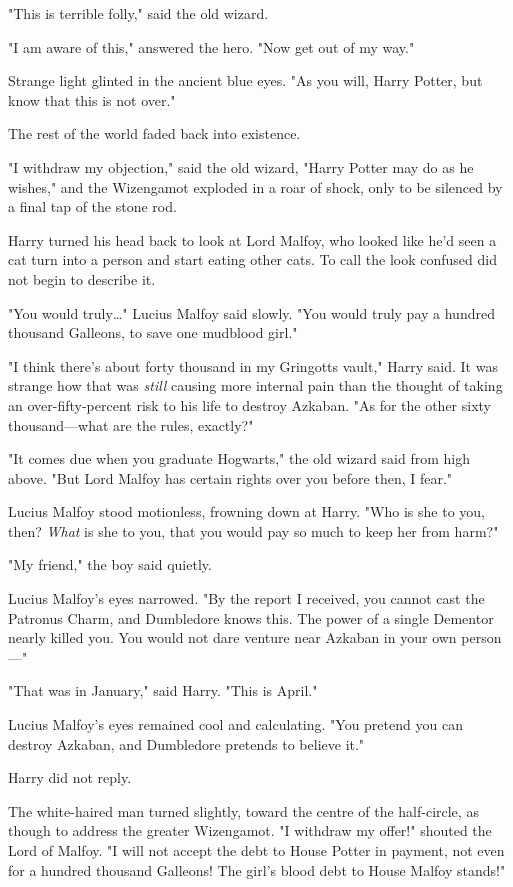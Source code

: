 "This is terrible folly," said the old wizard.

"I am aware of this," answered the hero. "Now get out of my way."

Strange light glinted in the ancient blue eyes. "As you will, Harry Potter, but
know that this is not over."

The rest of the world faded back into existence.

"I withdraw my objection," said the old wizard, "Harry Potter may do as he
wishes," and the Wizengamot exploded in a roar of shock, only to be silenced by
a final tap of the stone rod.

Harry turned his head back to look at Lord Malfoy, who looked like he'd seen a
cat turn into a person and start eating other cats. To call the look confused
did not begin to describe it.

"You would truly{\ldots}" Lucius Malfoy said slowly. "You would truly pay a
hundred thousand Galleons, to save one mudblood girl."

"I think there's about forty thousand in my Gringotts vault," Harry said. It
was strange how that was \emph{still} causing more internal pain than the
thought of taking an over-fifty-percent risk to his life to destroy Azkaban.
"As for the other sixty thousand---what are the rules, exactly?"

"It comes due when you graduate Hogwarts," the old wizard said from high above.
"But Lord Malfoy has certain rights over you before then, I fear."

Lucius Malfoy stood motionless, frowning down at Harry. "Who is she to you,
then? \emph{What} is she to you, that you would pay so much to keep her from
harm?"

"My friend," the boy said quietly.

Lucius Malfoy's eyes narrowed. "By the report I received, you cannot cast the
Patronus Charm, and Dumbledore knows this. The power of a single Dementor
nearly killed you. You would not dare venture near Azkaban in your own
person---"

"That was in January," said Harry. "This is April."

Lucius Malfoy's eyes remained cool and calculating. "You pretend you can
destroy Azkaban, and Dumbledore pretends to believe it."

Harry did not reply.

The white-haired man turned slightly, toward the centre of the half-circle, as
though to address the greater Wizengamot. "I withdraw my offer!" shouted the
Lord of Malfoy. "I will not accept the debt to House Potter in payment, not
even for a hundred thousand Galleons! The girl's blood debt to House Malfoy
stands!"

